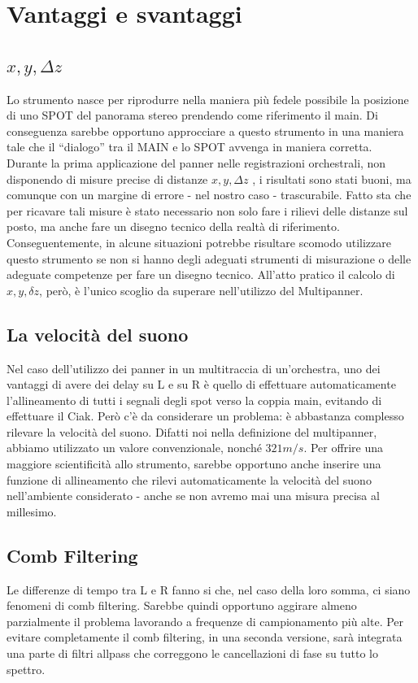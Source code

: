 \documentclass{article}
\begin{document}
\section{Vantaggi e svantaggi}

\subsection{$x, y, \Delta z$}
    Lo strumento nasce per riprodurre nella maniera più fedele possibile la posizione di uno SPOT del panorama stereo prendendo come riferimento il main. Di conseguenza sarebbe opportuno approcciare a questo strumento in una maniera tale che il ``dialogo'' tra il MAIN e lo SPOT avvenga in maniera corretta.
    Durante la prima applicazione del panner nelle registrazioni orchestrali, non disponendo di misure precise di distanze $x, y, \Delta z$ , i risultati sono stati buoni, ma comunque con un margine di errore - nel nostro caso - trascurabile.
    Fatto sta che per ricavare tali misure è stato necessario non solo fare i rilievi delle distanze sul posto, ma anche fare un disegno tecnico della realtà di riferimento. Conseguentemente, in alcune situazioni potrebbe risultare scomodo utilizzare questo strumento se non si hanno degli adeguati strumenti di misurazione o delle adeguate competenze per fare un disegno tecnico. All'atto pratico il calcolo di  $x, y, \delta z$, però, è l'unico scoglio da superare nell'utilizzo del Multipanner. %

\subsection{La velocità del suono}
    Nel caso dell'utilizzo dei panner in un multitraccia di un'orchestra, uno dei vantaggi di avere dei delay su L e su R è quello di effettuare automaticamente l'allineamento di tutti i segnali degli spot verso la coppia main, evitando di effettuare il Ciak. Però c'è da considerare un problema: è abbastanza complesso rilevare la velocità del suono. Difatti noi nella definizione del multipanner, abbiamo utilizzato un valore convenzionale, nonché $321 m/s$. Per offrire una maggiore scientificità allo strumento, sarebbe opportuno anche inserire una funzione di allineamento che rilevi automaticamente la velocità del suono nell'ambiente considerato - anche se non avremo mai una misura precisa al millesimo.
    
    
\subsection{Comb Filtering}
    Le differenze di tempo tra L e R fanno si che, nel caso della loro somma, ci siano fenomeni di comb filtering. Sarebbe quindi opportuno aggirare almeno parzialmente il problema lavorando a frequenze di campionamento più alte. Per evitare completamente il comb filtering, in una seconda versione, sarà integrata una parte di filtri allpass che correggono le cancellazioni di fase su tutto lo spettro.
\end{document}
